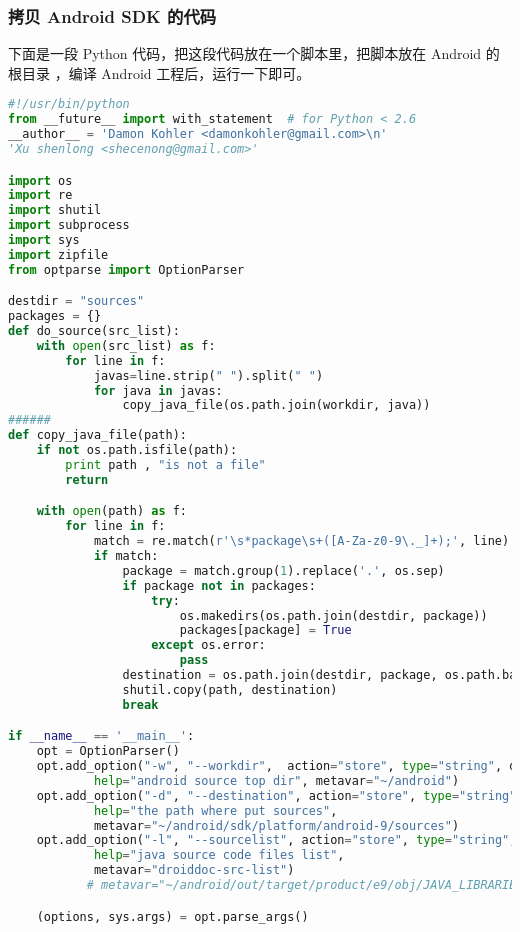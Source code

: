 \documentclass[a4paper,titlepage]{article}
\begin{document}
\subsubsection{拷贝 Android SDK 的代码}
\label{copyandroid}
下面是一段 Python 代码，把这段代码放在一个脚本里，把脚本放在 Android 的根目录
，编译 Android 工程后，运行一下即可。
\begin{lstlisting}[language=python]
#!/usr/bin/python
from __future__ import with_statement  # for Python < 2.6
__author__ = 'Damon Kohler <damonkohler@gmail.com>\n'
'Xu shenlong <shecenong@gmail.com>'

import os
import re
import shutil
import subprocess
import sys
import zipfile
from optparse import OptionParser

destdir = "sources"
packages = {}
def do_source(src_list):
    with open(src_list) as f:
        for line in f:
            javas=line.strip(" ").split(" ")
            for java in javas:
                copy_java_file(os.path.join(workdir, java))
######
def copy_java_file(path):
    if not os.path.isfile(path):
        print path , "is not a file"
        return

    with open(path) as f:
        for line in f:
            match = re.match(r'\s*package\s+([A-Za-z0-9\._]+);', line)
            if match:
                package = match.group(1).replace('.', os.sep)
                if package not in packages:
                    try:
                        os.makedirs(os.path.join(destdir, package))
                        packages[package] = True
                    except os.error:
                        pass
                destination = os.path.join(destdir, package, os.path.basename(path))
                shutil.copy(path, destination)
                break

if __name__ == '__main__':
    opt = OptionParser()
    opt.add_option("-w", "--workdir",  action="store", type="string", dest="workdir",
            help="android source top dir", metavar="~/android")
    opt.add_option("-d", "--destination", action="store", type="string", dest="dest",
            help="the path where put sources",
            metavar="~/android/sdk/platform/android-9/sources")
    opt.add_option("-l", "--sourcelist", action="store", type="string", dest="src_list",
            help="java source code files list",
            metavar="droiddoc-src-list")
           # metavar="~/android/out/target/product/e9/obj/JAVA_LIBRARIES/apt-stub_intermediates/droiddoc-src-list")

    (options, sys.args) = opt.parse_args()


\end{lstlisting}
\end{document}
